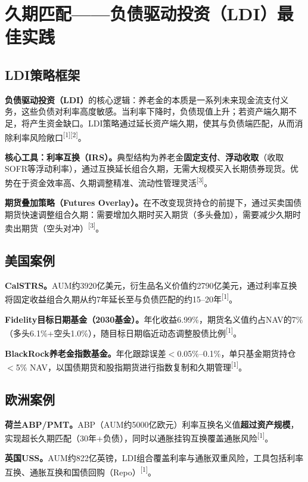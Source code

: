 \documentclass[10pt,a4paper,twocolumn]{ctexart}
\begin{document}
\section{久期匹配——负债驱动投资（LDI）最佳实践}

\subsection{LDI策略框架}

\textbf{负债驱动投资（LDI）}的核心逻辑：养老金的本质是一系列未来现金流支付义务，这些负债对利率高度敏感。当利率下降时，负债现值上升；若资产端久期不足，将产生资金缺口。LDI策略通过延长资产端久期，使其与负债端匹配，从而消除利率风险敞口\textsuperscript{[1][2]}。

\textbf{核心工具：利率互换（IRS）。}典型结构为养老金\textbf{固定支付}、\textbf{浮动收取}（收取SOFR等浮动利率），通过互换延长组合久期，无需大规模买入长期债券现货。优势在于资金效率高、久期调整精准、流动性管理灵活\textsuperscript{[3]}。

\textbf{期货叠加策略（Futures Overlay）。}在不改变现货持仓的前提下，通过买卖国债期货快速调整组合久期：需要增加久期时买入期货（多头叠加），需要减少久期时卖出期货（空头对冲）\textsuperscript{[3]}。

\subsection{美国案例}

\textbf{CalSTRS。}AUM约3920亿美元，衍生品名义价值约2790亿美元，通过利率互换将固定收益组合久期从约7年延长至与负债匹配的约15--20年\textsuperscript{[1]}。

\textbf{Fidelity目标日期基金（2030基金）。}年化收益6.99\%，期货名义值约占NAV的7\%（多头6.1\%+空头1.0\%），随目标日期临近动态调整股债比例\textsuperscript{[1]}。

\textbf{BlackRock养老金指数基金。}年化跟踪误差$<$0.05\%--0.1\%，单只基金期货持仓$<$5\% NAV，以国债期货和股指期货进行指数复制和久期管理\textsuperscript{[1]}。

\subsection{欧洲案例}

\textbf{荷兰ABP/PMT。}ABP（AUM约5000亿欧元）利率互换名义值\textbf{超过资产规模}，实现超长久期匹配（30年+负债），同时以通胀挂钩互换覆盖通胀风险\textsuperscript{[1]}。

\textbf{英国USS。}AUM约822亿英镑，LDI组合覆盖利率与通胀双重风险，工具包括利率互换、通胀互换和国债回购（Repo）\textsuperscript{[1]}。
\end{document}
